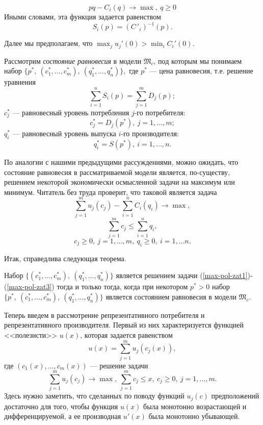    \[pq-C_{i}(q)\rightarrow\max, \ q\geqslant0\]
    Иными словами, эта функция задается равенством
    \[S_{i}(p)=(C\,'_{i})^{-1}(p).\]

    Далее мы предполагаем, что $\max_{j}u_{j}'(0)>\min_{i}C_{i}'(0)$.


    Рассмотрим \emph{состояние равновесия} в модели $\mathfrak{M}_{c}$,
    под которым мы понимаем набор
    $\{p^{*}, \ (c_{1}^{*},...,c_{m}^{*}), \
    (q_{1}^{*},...,q_{n}^{*})\},$
    где $p^{*}$ --- цена равновесия, т.е. решение уравнения
    \[\sum_{i=1}^{n}S_{i}(p)=\sum_{j=1}^{m}D_{j}(p);\]
    $c_{j}^{*}$ --- равновесный уровень потребления
    $j$-го потребителя:
    \[c_{j}^{*}=D_{j}(p^{*}), \ j=1,...,m;\]
    $q_{i}^{*}$ --- равновесный уровень выпуска $i$-го
    производителя:
    \[q_{i}^{*}=S(p^{*}), \ i=1,...,n.\]


    По аналогии с нашими предыдущими рассуждениями, можно ожидать,
    что состояние равновесия в рассматриваемой модели является,
    по-существу, решением некоторой экономически осмысленной задачи
    на максимум или минимум. Читатель без труда проверит, что
    таковой является задача
\begin{equation}
 \label{max-pol-zat1}
      \sum_{j=1}^{m}u_{j}(c_{j})-\sum_{i=1}^{n}C_{i}(q_{i})\rightarrow\max,
\end{equation}
\begin{equation}
 \label{max-pol-zat2}
      \sum_{j=1}^{m}c_{j}\leqslant\sum_{i=1}^{n}q_{i},
\end{equation}
\begin{equation}
 \label{max-pol-zat3}
      c_{j}\geqslant0, \ j=1,...,m, \ q_{i}\geqslant0, \ i=1,...n.
\end{equation}


    Итак, справедлива следующая теорема.
\begin{teo}
    Набор $\{(c_{1}^{*},...,c_{m}^{*}), \ (q_{1}^{*},...,q_{n}^{*})\}$
    является решением задачи
(\ref{max-pol-zat1})-(\ref{max-pol-zat3})
    тогда и только тогда, когда при некотором $p^{*}>0$ набор
    $\{p^{*}, \ (c_{1}^{*},...,c_{m}^{*}), \ (q_{1}^{*},...,q_{n}^{*})\}$
    является состоянием равновесия в модели $\mathfrak{M}_{c}$.
\end{teo}

    Теперь введем в рассмотрение репрезентативного потребителя и
    репрезентативного производителя. Первый из них характеризуется
    функцией <<полезнсти>> $u(x)$, которая задается равенством
    \[u(x)=\sum_{j=1}^{m}u_{j}(c_{j}(x)),\]
    где $(c_{1}(x),...,c_{m}(x))$ --- решение задачи
    \[\sum_{j=1}^{m}u_{j}(c_{j})\rightarrow\max, \ \sum_{j=1}^{m}c_{j}\leqslant x, \
    c_{j}\geqslant 0, \ j=1,...,m.\]
    Здесь нужно заметить, что сделанных по поводу функций
    $u_{j}(c)$ предположений
    достаточно для того, чтобы функция $u(x)$ была монотонно возрастающей и
    дифференцируемой, а ее производная $u'(x)$ была монотонно убывающей.






